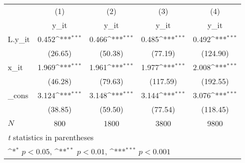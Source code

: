 {
\def\sym#1{\ifmmode^{#1}\else\(^{#1}\)\fi}
\begin{tabular}{l*{4}{c}}
\hline\hline
            &\multicolumn{1}{c}{(1)}&\multicolumn{1}{c}{(2)}&\multicolumn{1}{c}{(3)}&\multicolumn{1}{c}{(4)}\\
            &\multicolumn{1}{c}{y\_it}&\multicolumn{1}{c}{y\_it}&\multicolumn{1}{c}{y\_it}&\multicolumn{1}{c}{y\_it}\\
\hline
L.y\_it      &       0.452\sym{***}&       0.466\sym{***}&       0.485\sym{***}&       0.492\sym{***}\\
            &     (26.65)         &     (50.38)         &     (77.19)         &    (124.90)         \\
[1em]
x\_it        &       1.969\sym{***}&       1.961\sym{***}&       1.977\sym{***}&       2.008\sym{***}\\
            &     (46.28)         &     (79.63)         &    (117.59)         &    (192.55)         \\
[1em]
\_cons      &       3.124\sym{***}&       3.148\sym{***}&       3.144\sym{***}&       3.076\sym{***}\\
            &     (38.85)         &     (59.50)         &     (77.54)         &    (118.45)         \\
\hline
\(N\)       &         800         &        1800         &        3800         &        9800         \\
\hline\hline
\multicolumn{5}{l}{\footnotesize \textit{t} statistics in parentheses}\\
\multicolumn{5}{l}{\footnotesize \sym{*} \(p<0.05\), \sym{**} \(p<0.01\), \sym{***} \(p<0.001\)}\\
\end{tabular}
}
